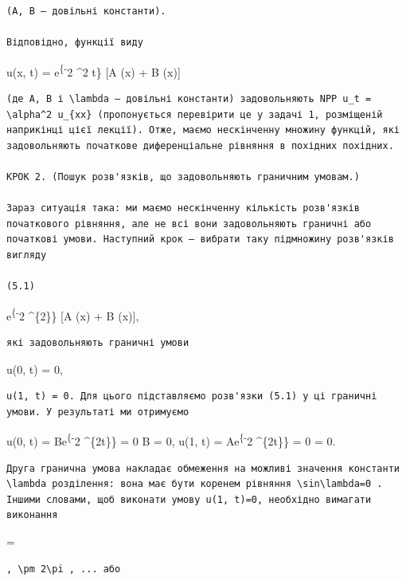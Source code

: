 \documentclass[
  ukrainian,
]{article}
\begin{document}
\begin{verbatim}
(A, B — довільні константи).

Відповідно, функції виду
\end{verbatim}

u(x, t) = e\textsuperscript{\{-\lambda}2 \alpha\^{}2 t\} {[}A
\sin(\lambda x) + B \cos(\lambda x){]}

\begin{verbatim}
(де A, B і \lambda — довільні константи) задовольняють NPP u_t = \alpha^2 u_{xx} (пропонується перевірити це у задачі 1, розміщеній наприкінці цієї лекції). Отже, маємо нескінченну множину функцій, які задовольняють початкове диференціальне рівняння в похідних похідних.

КРОК 2. (Пошук розв'язків, що задовольняють граничним умовам.)

Зараз ситуація така: ми маємо нескінченну кількість розв'язків початкового рівняння, але не всі вони задовольняють граничні або початкові умови. Наступний крок — вибрати таку підмножину розв'язків вигляду

(5.1)
\end{verbatim}

e\textsuperscript{\{-\lambda}2 \alpha\^{}\{2\ell\}\} {[}A
\sin(\lambda x) + B \cos(\lambda x){]},

\begin{verbatim}
які задовольняють граничні умови
\end{verbatim}

u(0, t) = 0,

\begin{verbatim}
u(1, t) = 0. Для цього підставляємо розв'язки (5.1) у ці граничні умови. У результаті ми отримуємо
\end{verbatim}

u(0, t) = Be\textsuperscript{\{-\lambda}2 \alpha\^{}\{2t\}\} = 0
\Rightarrow B = 0, u(1, t) = Ae\textsuperscript{\{-\lambda}2
\alpha\^{}\{2t\}\} \sin \lambda = 0 \Rightarrow \sin \lambda = 0.

\begin{verbatim}
Друга гранична умова накладає обмеження на можливі значення константи \lambda розділення: вона має бути коренем рівняння \sin\lambda=0 . Іншими словами, щоб виконати умову u(1, t)=0, необхідно вимагати виконання
\end{verbatim}

\lambda = \pm \pi

\begin{verbatim}
, \pm 2\pi , ... або
\end{verbatim}
\end{document}
